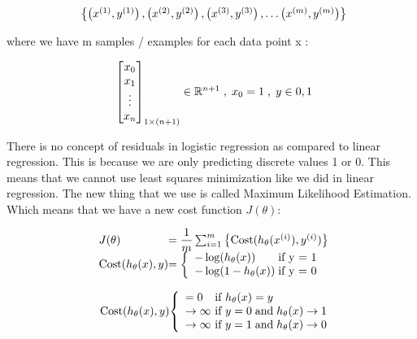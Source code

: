 \[
	\begin{array}{ l@{} l@{} }
	\left\{
		\left( x^{(1)},y^{(1)} \right),
		\left( x^{(2)},y^{(2)} \right),
		\left( x^{(3)},y^{(3)} \right),
		\ldots
		\left( x^{(m)},y^{(m)} \right)
	\right\}
	\end{array}
\]

where we have m samples / examples for each data point x :

\[
	\begin{array}{ l@{} l@{} }
	\begin{bmatrix}
		x_0 \\
		x_1 \\
		\vdots \\
		x_n \\
		\end{bmatrix}
		_{1 \times(n+1)}
	\in \mathbb{R}^{n+1}
	\; , \;
	x_0 = {1}
	\; , \;
	y \in {0,1}
	\end{array}
\]

There is no concept of residuals in logistic regression as compared to
linear regression. This is because we are only predicting discrete values 1
or 0. This means that we cannot use least squares minimization like we did
in linear regression. The new thing that we use is called Maximum Likelihood
Estimation. Which means that we have a new cost function $J(\theta)$:


\[
	\begin{array}{ l@{} l@{} }
	J(\theta)
	& =
	\dfrac{1}{m}
	\sum_{i=1}^m
	\left\{
		\mathrm{Cost}(h_\theta(x^{(i)}),y^{(i)})
	\right\}
	\\
	\mathrm{Cost}(h_\theta(x),y)
	& =
	\left\{
		\begin{array}{ l@{} l@{} } 
			-\log(h_\theta(x))
			\;
			& \text{if y = 1} 
			\\ 
			-\log(1-h_\theta(x))
			\;
			& \text{if y = 0} 
		\end{array}
	\right.  
	\end{array}
\]

\[
	\begin{array}{ l@{} l@{} }
		\mathrm{Cost}(h_\theta(x),y)
		&
		\left\{
		\begin{array}{ l@{} l@{} l@{} }
			& = 0
			& \text{ if } h_\theta(x) = y
			\\
			& \rightarrow \infty
			&\text{ if } y = 0
			\; \mathrm{and} \;
			h_\theta(x) \rightarrow 1
			\\
			& \rightarrow \infty
			& \text{ if } y = 1
			\; \mathrm{and} \;
			h_\theta(x) \rightarrow 0
			\\
		\end{array}
	\right.
	\end{array}
\]


